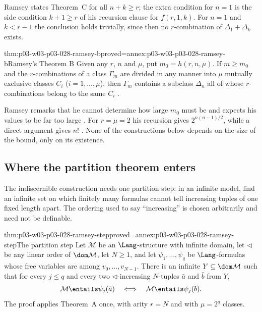 Ramsey states Theorem~C for all \(n+k\geq r\); the extra condition for
\(n=1\) is the side condition \(k+1\geq r\) of his recursion clause for
\(f(r,1,k)\).  For \(n=1\) and \(k<r-1\) the conclusion holds trivially,
since then no \(r\)-combination of \(\Delta_1+\Delta_k\) exists.

\begin{hbtheorem}{thm:p03-w03-p03-028-ramsey-b}{proved=annex:p03-w03-p03-028-ramsey-b}{Ramsey's Theorem B}
Given any \(r\), \(n\) and \(\mu\), put \(m_0=h(r,n,\mu)\).  If
\(m\geq m_0\) and the \(r\)-combinations of a class \(\Gamma_m\) are
divided in any manner into \(\mu\) mutually exclusive classes \(C_i\)
(\(i=1,\ldots,\mu\)), then \(\Gamma_m\) contains a subclass \(\Delta_n\)
all of whose \(r\)-combinations belong to the same \(C_i\)
\cite[p.~267, proof pp.~267--269]{Ramsey1930}.
\end{hbtheorem}

Ramsey remarks that he cannot determine how large \(m_0\) must be and
expects his values to be far too large \cite[p.~267]{Ramsey1930}.  For
\(r=\mu=2\) his recursion gives \(2^{n(n-1)/2}\), while a direct argument
gives \(n!\) \cite[p.~269]{Ramsey1930}.  None of the constructions below
depends on the size of the bound, only on its existence.

\subsection{Where the partition theorem enters}
\label{sec:p03-w03-p03-028-step}

The indiscernible construction needs one partition step: in an infinite
model, find an infinite set on which finitely many formulas cannot tell
increasing tuples of one fixed length apart.  The ordering used to say
``increasing'' is chosen arbitrarily and need not be definable.

\begin{hblemma}{thm:p03-w03-p03-028-ramsey-step}{proved=annex:p03-w03-p03-028-ramsey-step}{The partition step}
Let \(\mathcal M\) be an \(\Lang\)-structure with infinite domain, let
\(\lhd\) be any linear order of \(\dom\mathcal M\), let \(N\geq1\), and
let \(\psi_1,\ldots,\psi_q\) be \(\Lang\)-formulas whose free variables are
among \(v_0,\ldots,v_{N-1}\).  There is an infinite
\(Y\subseteq\dom\mathcal M\) such that for every \(j\leq q\) and every two
\(\lhd\)-increasing \(N\)-tuples \(\bar a\) and \(\bar b\) from \(Y\),
\[
  \mathcal M\entails\psi_j(\bar a)
  \quad\Longleftrightarrow\quad
  \mathcal M\entails\psi_j(\bar b).
\]
The proof applies Theorem~A once, with arity \(r=N\) and with
\(\mu=2^q\) classes.
\end{hblemma}

